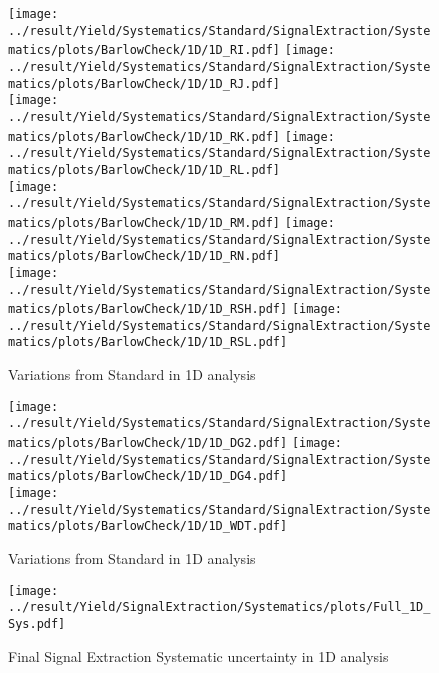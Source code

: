 \newpage
\begin{figure}
	\centering
		\texttt{[image: ../result/Yield/Systematics/Standard/SignalExtraction/Systematics/plots/BarlowCheck/1D/1D\_RI.pdf]}
		\texttt{[image: ../result/Yield/Systematics/Standard/SignalExtraction/Systematics/plots/BarlowCheck/1D/1D\_RJ.pdf]}\\
		\texttt{[image: ../result/Yield/Systematics/Standard/SignalExtraction/Systematics/plots/BarlowCheck/1D/1D\_RK.pdf]}
		\texttt{[image: ../result/Yield/Systematics/Standard/SignalExtraction/Systematics/plots/BarlowCheck/1D/1D\_RL.pdf]}\\
		\texttt{[image: ../result/Yield/Systematics/Standard/SignalExtraction/Systematics/plots/BarlowCheck/1D/1D\_RM.pdf]}
		\texttt{[image: ../result/Yield/Systematics/Standard/SignalExtraction/Systematics/plots/BarlowCheck/1D/1D\_RN.pdf]}\\
		\texttt{[image: ../result/Yield/Systematics/Standard/SignalExtraction/Systematics/plots/BarlowCheck/1D/1D\_RSH.pdf]}
		\texttt{[image: ../result/Yield/Systematics/Standard/SignalExtraction/Systematics/plots/BarlowCheck/1D/1D\_RSL.pdf]}
		\caption{Variations from Standard in 1D analysis}
		\label{}
\end{figure}

\newpage
\begin{figure}
	\centering
		\texttt{[image: ../result/Yield/Systematics/Standard/SignalExtraction/Systematics/plots/BarlowCheck/1D/1D\_DG2.pdf]}
		\texttt{[image: ../result/Yield/Systematics/Standard/SignalExtraction/Systematics/plots/BarlowCheck/1D/1D\_DG4.pdf]}\\
		\texttt{[image: ../result/Yield/Systematics/Standard/SignalExtraction/Systematics/plots/BarlowCheck/1D/1D\_WDT.pdf]}
		\caption{Variations from Standard in 1D analysis}
		\label{}
\end{figure}

\begin{figure}
	\centering
		\texttt{[image: ../result/Yield/SignalExtraction/Systematics/plots/Full\_1D\_Sys.pdf]}
		\caption{Final Signal Extraction Systematic uncertainty in 1D analysis}
		\label{}
\end{figure}

